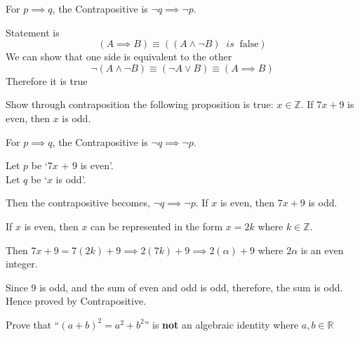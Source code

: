 \documentclass[addpoints]{exam}
\newenvironment{problem}[2][Problem]{\begin{trivlist}
    \item[\hskip \labelsep {\bfseries #1}\hskip \labelsep {\bfseries #2.}]}{\end{trivlist}}
\begin{document}
\begin{sloppypar}
\begin{questions}
\begin{solution}
            For $ p \implies q $, the Contrapositive is $ \neg q \implies \neg p $.
            
            Statement is 
            \[(A \implies B ) \equiv ((A \land \neg B) \;\; is \;\; \text{false})\]
            We can show that one side is equivalent to the other
            \begin{equation*}
                \neg (A \land \neg B) \equiv (\neg A \lor B) \equiv (A \implies B)
            \end{equation*}
            Therefore it is true

        \end{solution}
    \end{questions}
    \pagebreak
    \begin{problem}{4}
    Show through contraposition the following proposition is true: $x \in \mathbb{Z}$. If $7x + 9$ is even, then $x$ is odd.
    \end{problem}

    \begin{questions}
        \question
        \begin{solution}
            
            For $ p \implies q $, the Contrapositive is $ \neg q \implies \neg p $.

            Let $ p $ be `7$x$ + 9  is even'. \\ Let $q$ be `$x$ is odd'.

            Then the contrapositive becomes, $ \neg q\implies \neg p $. If $x$ is even, then $ 7x + 9 $ is odd. 

            If $x$ is even, then $x$ can be represented in the form $x = 2k$ where $ k \in \mathbb{Z} $. 
            
            Then $ 7x + 9 = 7(2k) + 9 \implies 2(7k) + 9 \implies 2(\alpha) + 9 $ where $ 2\alpha $ is an even integer. 
            
            Since 9 is odd, and the sum of even and odd is odd, therefore, the sum is odd. Hence proved by Contrapositive.
        \end{solution}
    \end{questions}

    \begin{problem}{5}
    Prove that ``$(a+b)^2 = a^2 +b^2$'' is \textbf{not} an algebraic identity where $a,b \in \mathbb{R}$
    \end{problem}

    \begin{questions}
        \question
        \begin{solution}
            

\end{solution}
\end{questions}
\end{sloppypar}
\end{document}
